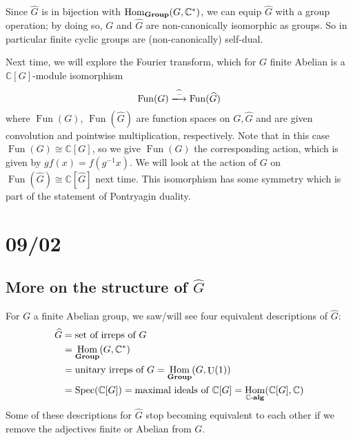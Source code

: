 \documentclass[11pt,leqno]{article}
\theoremstyle{plain}
\theoremstyle{definition}
\numberwithin{equation}{section}
\numberwithin{lem}{section}
\DeclareMathOperator{\Hom}{Hom}
\DeclareMathOperator{\Fun}{Fun}
\DeclareMathOperator{\Spec}{Spec}
\DeclareMathOperator{\U}{U}
\newcommand{\catname}[1]{{\normalfont\mathbf{#1}}}
\newcommand{\alg}{\text{-}\catname{alg}}
\newcommand{\Group}{\catname{Group}}
\begin{document}
\begin{figure}[h]
  \centering
\end{figure}

Since $\widehat G$ is in bijection with $\Hom_{\Group}(G,\mathbb C^\ast)$, we can equip $\widehat G$ with a group operation; by doing so, $G$ and $\widehat G$ are non-canonically isomorphic as groups. So in particular finite cyclic groups are (non-canonically) self-dual.

Next time, we will explore the Fourier transform, which for $G$ finite Abelian is a $\mathbb C[G]$-module isomorphism
\[\Fun(G)\xlongrightarrow{\widehat{-}}\Fun(\widehat G)\]
where $\Fun(G)$, $\Fun(\widehat G)$ are function spaces on $G,\widehat G$ and are given convolution and pointwise multiplication, respectively. Note that in this case $\Fun(G) \cong \mathbb C[G]$, so we give $\Fun(G)$ the corresponding action, which is given by $gf(x) = f(g^{-1}x)$. We will look at the action of $G$ on $\Fun(\hat G)\cong \mathbb C[\widehat G]$ next time. This isomorphism has some symmetry which is part of the statement of Pontryagin duality.

\newpage\section{09/02}
\subsection{More on the structure of $\widehat G$}
For $G$ a finite Abelian group, we saw/will see four equivalent descriptions of $\widehat G$:
\begin{align*}
	\widehat G &= \text{set of irreps of $G$}\\
	&= \Hom_{\Group}(G,\mathbb C^\ast)\\
	&= \text{unitary irreps of $G$} = \Hom_{\Group}(G,\U(1))\\
	&= \Spec(\mathbb C[G]) = \text{maximal ideals of $\mathbb C[G]$} = \Hom_{\mathbb C\alg}(\mathbb C[G],\mathbb C)
\end{align*}
Some of these descriptions for $\widehat G$ stop becoming equivalent to each other if we remove the adjectives finite or Abelian from $G$.
\end{document}
